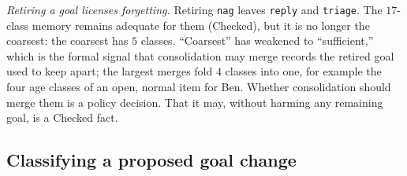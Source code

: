 \documentclass[11pt]{article}
\newcommand{\code}[1]{\texttt{#1}}
\theoremstyle{definition}
\theoremstyle{plain}
\begin{document}
\emph{Retiring a goal licenses forgetting.} Retiring \code{nag} leaves \code{reply} and
\code{triage}. The $17$-class memory remains adequate for them (Checked), but it is no longer the
coarsest: the coarsest has $5$ classes. ``Coarsest'' has weakened to ``sufficient,'' which is the
formal signal that consolidation may merge records the retired goal used to keep apart; the largest
merges fold $4$ classes into one, for example the four age classes of an open, normal item for
Ben. Whether consolidation
should merge them is a policy decision. That it may, without harming any remaining goal, is a
Checked fact.

\subsection{Classifying a proposed goal change}\label{sec:classify}
\end{document}
